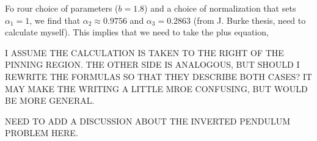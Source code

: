 \documentclass[../main/TimeForcingSHE.tex]{subfiles}
\begin{document}
Fo rour choice of parameters ($b=1.8$) and a choice of normalization that sets $\alpha_1=1$, we find that $\alpha_2\approx 0.9756$ and $\alpha_3=0.2863$ (from J. Burke thesis, need to calculate myself). This implies that we need to take the plus equation, 

I ASSUME THE CALCULATION IS TAKEN TO THE RIGHT OF THE PINNING REGION. THE OTHER SIDE IS ANALOGOUS, BUT SHOULD I REWRITE THE FORMULAS SO THAT THEY DESCRIBE BOTH CASES?  IT MAY MAKE THE WRITING A LITTLE MROE CONFUSING, BUT WOULD BE MORE GENERAL.


NEED TO ADD A DISCUSSION ABOUT THE INVERTED PENDULUM PROBLEM HERE.
\end{document}
